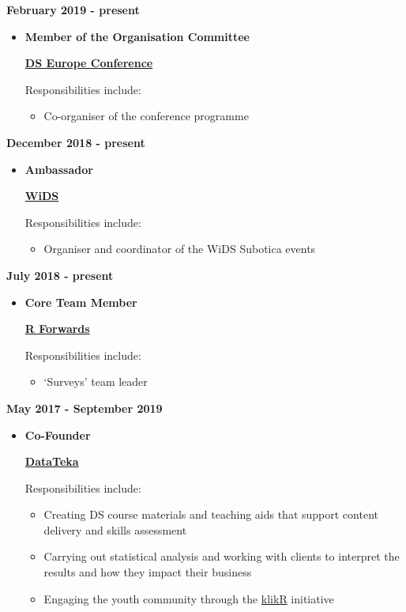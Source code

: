 \documentclass[
]{article}
\providecommand{\tightlist}{%
  \setlength{\itemsep}{0pt}\setlength{\parskip}{0pt}}
\begin{document}
\textbf{February 2019 - present}

\begin{itemize}
\item
  \textbf{Member of the Organisation Committee}

  \href{https://datasciconference.com/}{\textbf{DS Europe Conference}}

  Responsibilities include:

  \begin{itemize}
  \tightlist
  \item
    Co-organiser of the conference programme
  \end{itemize}
\end{itemize}

\textbf{December 2018 - present}

\begin{itemize}
\item
  \textbf{Ambassador}

  \href{https://www.widsconference.org/}{\textbf{WiDS}}

  Responsibilities include:

  \begin{itemize}
  \tightlist
  \item
    Organiser and coordinator of the WiDS Subotica events
  \end{itemize}
\end{itemize}

\textbf{July 2018 - present}

\begin{itemize}
\item
  \textbf{Core Team Member}

  \href{https://forwards.github.io/}{\textbf{R Forwards}}

  Responsibilities include:

  \begin{itemize}
  \tightlist
  \item
    `Surveys' team leader
  \end{itemize}
\end{itemize}

\textbf{May 2017 - September 2019}

\begin{itemize}
\item
  \textbf{Co-Founder}

  \href{https://www.datateka.com}{\textbf{DataTeka}}

  Responsibilities include:

  \begin{itemize}
  \tightlist
  \item
    Creating DS course materials and teaching aids that support content
    delivery and skills assessment
  \item
    Carrying out statistical analysis and working with clients to
    interpret the results and how they impact their business
  \item
    Engaging the youth community through the
    \href{http://klikr.rbind.io}{klikR} initiative
  \end{itemize}
\end{itemize}
\end{document}
